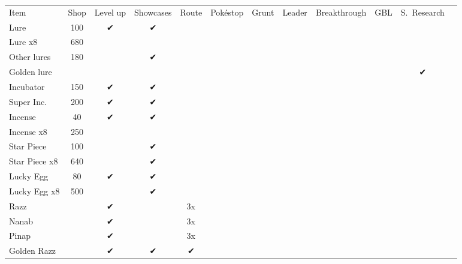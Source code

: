 \begin{table}
\centering
\begin{tabular}{p{}ccccccccccc}
Item              & Shop & Level up
                             & Showcases
                                         & Route
                                              & Pokéstop
                                                    & Grunt
                                                          & Leader
                                                                & Breakthrough
                                                                    & GBL
                                                                        & S.\ Research \\
\Midrule
Lure              & 100  & ✔ & ✔         &    &     &     &     &   &   &   \\
Lure x8           & 680  &   &           &    &     &     &     &   &   &   \\
Other lures       & 180  &   & ✔         &    &     &     &     &   &   &   \\
Golden lure       &      &   &           &    &     &     &     &   &   & ✔ \\
Incubator         & 150  & ✔ & ✔         &    &     &     &     &   &   &   \\
Super Inc.        & 200  & ✔ & ✔         &    &     &     &     &   &   &   \\
Incense           & 40   & ✔ & ✔         &    &     &     &     &   &   &   \\
Incense x8        & 250  &   &           &    &     &     &     &   &   &   \\
Star Piece        & 100  &   & ✔         &    &     &     &     &   &   &   \\
Star Piece x8     & 640  &   & ✔         &    &     &     &     &   &   &   \\
Lucky Egg         & 80   & ✔ & ✔         &    &     &     &     &   &   &   \\
Lucky Egg x8      & 500  &   & ✔         &    &     &     &     &   &   &   \\
Razz              &      & ✔ &           & 3x &     &     &     &   &   &   \\
Nanab             &      & ✔ &           & 3x &     &     &     &   &   &   \\
Pinap             &      & ✔ &           & 3x &     &     &     &   &   &   \\
Golden Razz       &      & ✔ & ✔         & ✔  &     &     &     &   &   &   \\

\end{tabular}
\end{table}
